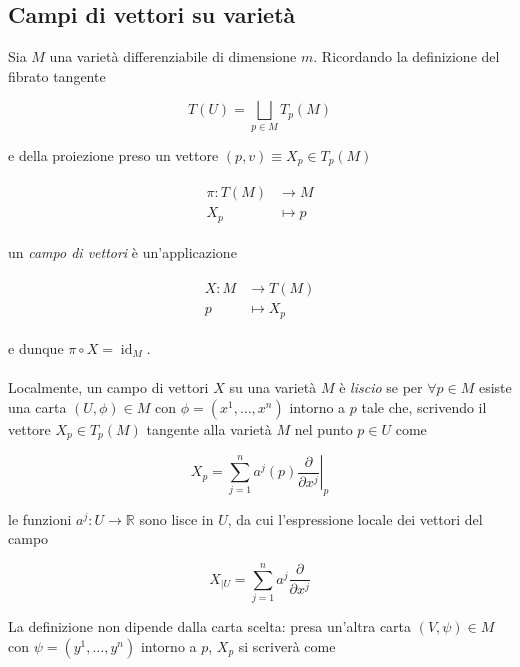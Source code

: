\subsection{Campi di vettori su varietà}

Sia $ M $ una varietà differenziabile di dimensione $ m $. Ricordando la definizione del fibrato tangente

\begin{equation}
	T(U) = \bigsqcup_{p \in M} T_{p}(M)
\end{equation}

e della proiezione preso un vettore $ (p,v) \equiv X_{p} \in T_{p}(M) $

\begin{align}
	\begin{split}
		\pi : T(M) &\to M\\
		X_{p} &\mapsto p
	\end{split}
\end{align}

un \textit{campo di vettori} è un'applicazione

\begin{align}
	\begin{split}
		X : M &\to T(M)\\
		p &\mapsto X_{p}
	\end{split}
\end{align}

e dunque $ \pi \circ X = \operatorname{id}_{M} $.\\\\
%
Localmente, un campo di vettori $ X $ su una varietà $ M $ è \textit{liscio} se per $ \forall p \in M $ esiste una carta $ (U,\phi) \in M $ con $ \phi = (x^{1},\dots,x^{n}) $ intorno a $ p $ tale che, scrivendo il vettore $ X_{p} \in T_{p}(M) $ tangente alla varietà $ M $ nel punto $ p \in U $ come

\begin{equation}
	X_{p} = \sum_{j=1}^{n} a^{j}(p) \left. \dfrac{\partial}{\partial x^{j}} \right|_{p} 
\end{equation}

le funzioni $ a^{j} : U \to \mathbb{R} $ sono lisce in $ U $, da cui l'espressione locale dei vettori del campo

\begin{equation}
	X_{|U} = \sum_{j=1}^{n} a^{j} \dfrac{\partial}{\partial x^{j}}
\end{equation}

La definizione non dipende dalla carta scelta: presa un'altra carta $ (V,\psi) \in M $ con $ \psi = (y^{1},\dots,y^{n}) $ intorno a $ p $, $ X_{p} $ si scriverà come

